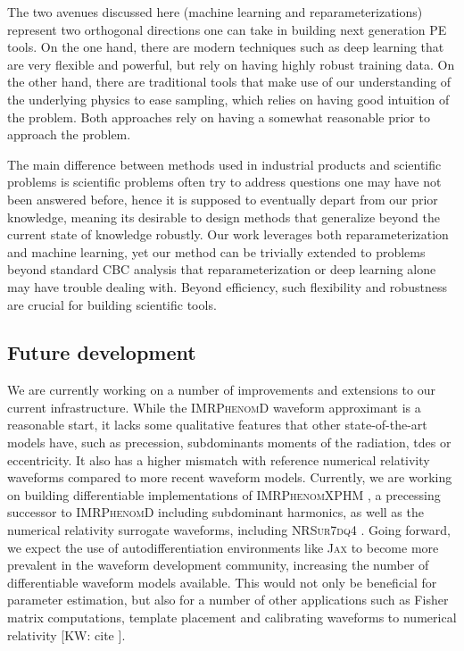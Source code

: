 \documentclass[twocolumn]{aastex631}
\newcommand{\kw}[1]{{\color{rb4}[KW: #1 ]}}
\begin{document}
The two avenues discussed here (machine learning and reparameterizations)
represent two orthogonal directions one can take in building next generation PE
tools. On the one hand, there are modern techniques such as deep learning that
are very flexible and powerful, but rely on having highly robust training data.
On the other hand, there are traditional tools that make use of our
understanding of the underlying physics to ease sampling, which relies
on having good intuition of the problem. Both approaches rely on having a
somewhat reasonable prior to approach the problem.

The main difference between methods used in industrial products and scientific
problems is scientific problems often try to address questions one may have not
been answered before, hence it is supposed to eventually depart from our prior
knowledge, meaning its desirable to design methods that generalize beyond the
current state of knowledge robustly. Our work leverages both reparameterization
and machine learning, yet our method can be trivially extended to problems
beyond standard CBC analysis that reparameterization or deep learning alone may
have trouble dealing with. Beyond efficiency, such flexibility and robustness
are crucial for building scientific tools.

\subsection{Future development}

We are currently working on a number of improvements and extensions to our
current infrastructure. While the \textsc{IMRPhenomD} waveform approximant is a
reasonable start, it lacks some qualitative features that other
state-of-the-art models have, such as precession, subdominants moments of the
radiation, tdes or eccentricity. It also has a higher mismatch with reference
numerical relativity waveforms compared to more recent waveform models.
Currently, we are working on building differentiable implementations of
\textsc{IMRPhenomXPHM} \cite{Pratten:2020ceb}, a precessing successor to
\textsc{IMRPhenomD} including subdominant harmonics, as well as the numerical
relativity surrogate waveforms, including \textsc{NRSur7dq4}
\cite{Varma:2018mmi}. Going forward, we expect the use of autodifferentiation
environments like \textsc{Jax} to become more prevalent in the waveform
development community, increasing the number of differentiable waveform models
available. This would not only be beneficial for parameter estimation, but also
for a number of other applications such as Fisher matrix computations, template
placement and calibrating waveforms to numerical relativity \kw{cite}.
\end{document}
